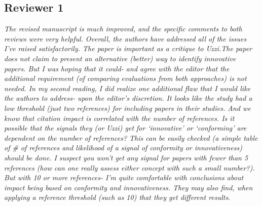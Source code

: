\documentclass[NETN]{stjour}
\begin{document}
\subsection{Reviewer 1}

\emph{The revised manuscript is much improved, and the specific comments to both reviews were very helpful. Overall, the authors have addressed all of the issues I’ve raised satisfactorily. The paper is important as a critique to Uzzi.The paper does not claim to present an alternative (better) way to identify innovative papers.  But I was hoping that it could- and agree with the editor that the additional requirement (of comparing evaluations from both approaches) is not needed.
In my second reading, I did realize one additional flaw that I would like the authors to address- upon the editor’s discretion.  It looks like the study had a low threshold (just two references) for including papers in their studies. And we know that citation impact is correlated with the number of references. Is it possible that the signals they (or Uzzi) get for ‘innovative’ or ‘conforming’ are dependent on the number of references? This can be easily checked (a simple table of \# of references and likelihood of a signal of conformity or innovativeness) should be done. I suspect you won’t get any signal for papers with fewer than 5 references (how can one really assess either concept with such a small number?).  But with 10 or more references- I’m quite comfortable with conclusions about impact being based on conformity and innovativeness. They may also find, when applying a reference threshold (such as 10) that they get different results.}
\end{document}
